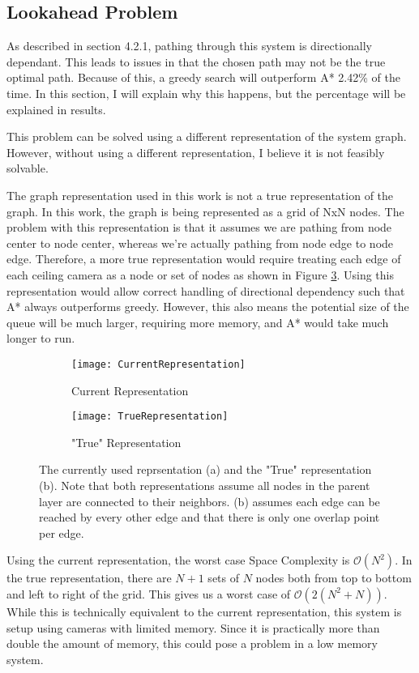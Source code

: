 \subsection{Lookahead Problem}
As described in section 4.2.1, pathing through this system is directionally dependant. This leads to issues in that the chosen path may not be the true optimal path. Because of this, a greedy search will outperform A* 2.42\% of the time. In this section, I will explain why this happens, but the percentage will be explained in results. 

This problem can be solved using a different representation of the system graph. However, without using a different representation, I believe it is not feasibly solvable. 

The graph representation used in this work is not a true representation of the graph. In this work, the graph is being represented as a grid of NxN nodes. The problem with this representation is that it assumes we are pathing from node center to node center, whereas we're actually pathing from node edge to node edge. Therefore, a more true representation would require treating each edge of each ceiling camera as a node or set of nodes as shown in Figure \ref{fig:RepDiagrams}. Using this representation would allow correct handling of directional dependency such that A* always outperforms greedy. However, this also means the potential size of the queue will be much larger, requiring more memory, and A* would take much longer to run.

\begin{figure}[h]
\centering
\begin{subfigure}{.49\textwidth}
\centering
	\texttt{[image: CurrentRepresentation]}
	\caption{Current Representation}
	\label{fig:CurRep}
\end{subfigure}
\begin{subfigure}{.49\textwidth}
	\centering
	\texttt{[image: TrueRepresentation]}
	\caption{"True" Representation}
	\label{fig:TrueRep}
\end{subfigure}
\caption{The currently used reprsentation (a) and the "True" representation (b). Note that both representations assume all nodes in the parent layer are connected to their neighbors. (b) assumes each edge can be reached by every other edge and that there is only one overlap point per edge.}
\label{fig:RepDiagrams}
\end{figure}

Using the current representation, the worst case Space Complexity is $\mathcal{O}(N^2)$. In the true representation, there are $N+1$ sets of $N$ nodes both from top to bottom and left to right of the grid. This gives us a worst case of $\mathcal{O}(2(N^2 + N))$. While this is technically equivalent to the current representation, this system is setup using cameras with limited memory. Since it is practically more than double the amount of memory, this could pose a problem in a low memory system.

